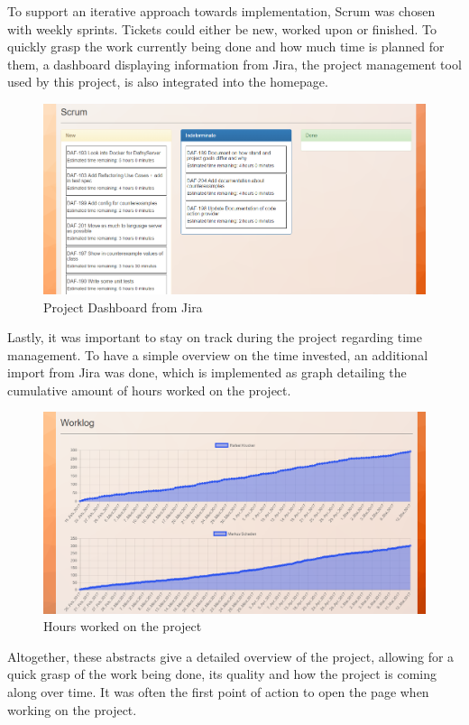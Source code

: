 To support an iterative approach towards implementation, Scrum was chosen with weekly sprints. Tickets could either be new, worked upon or finished. To quickly grasp the work currently being done and how much time is planned for them, a dashboard displaying information from Jira, the project management tool used by this project, is also integrated into the homepage.\newline
\begin{figure}[H]
	\centering
	\includegraphics[width=1\textwidth]{img/homeScrum}
	\caption{Project Dashboard from Jira}
	\label{fig:Jira}
\end{figure}
Lastly, it was important to stay on track during the project regarding time management. To have a simple overview on the time invested, an additional import from Jira was done, which is implemented as graph detailing the cumulative amount of hours worked on the project. \newline
\begin{figure}[H]
	\centering
	\includegraphics[width=1\textwidth]{img/homeTime}
	\caption{Hours worked on the project}
	\label{fig:Jira Hours}
\end{figure}
Altogether, these abstracts give a detailed overview of the project, allowing for a quick grasp of the work being done, its quality and how the project is coming along over time. It was often the first point of action to open the page when working on the project. 
